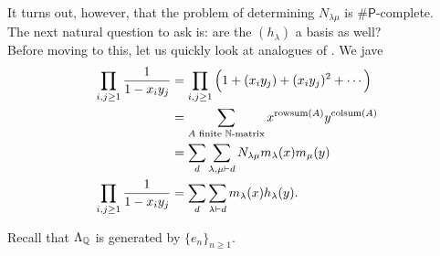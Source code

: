 	It turns out, however, that the problem of determining $N_{\lambda\mu}$ is $\#\mathsf{P}$-complete.\\ %
	The next natural question to ask is: are the $(h_\lambda)$ a basis as well?\\
	Before moving to this, let us quickly look at analogues of . We jave
	\begin{align}
		\prod_{i,j \ge 1} \frac{1}{1-x_iy_j} &= \prod_{i,j \ge 1} \left(1 + (x_iy_j) + (x_iy_j)^2 + \cdots\right) \nonumber \\
			&= \sum_{\text{$A$ finite $\mathbb{N}$-matrix}} x^{\operatorname{rowsum}(A)} y^{\operatorname{colsum}(A)} \nonumber \\
			&= \sum_d \sum_{\lambda,\mu \vdash d} N_{\lambda\mu} m_\lambda(x) m_\mu(y) \nonumber \\
		\prod_{i,j \ge 1} \frac{1}{1-x_iy_j} &= \sum_d \sum_{\lambda \vdash d} m_\lambda(x) h_\lambda(y). \label{eqn: prod 1 m xi yj}
	\end{align}

	Recall that $\Lambda_{\mathbb{Q}}$ is generated by $\{e_n\}_{n \ge 1}$.

